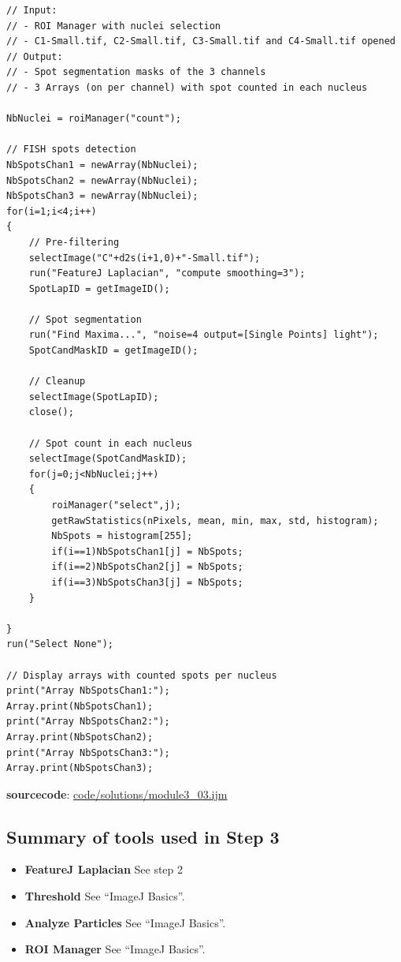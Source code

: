 \documentclass[11pt,a4paper,oneside]{report}
\begin{document}
\begin{lstlisting}[linerange={1-6}]
// Input: 
// - ROI Manager with nuclei selection
// - C1-Small.tif, C2-Small.tif, C3-Small.tif and C4-Small.tif opened
// Output: 
// - Spot segmentation masks of the 3 channels
// - 3 Arrays (on per channel) with spot counted in each nucleus

NbNuclei = roiManager("count");

// FISH spots detection
NbSpotsChan1 = newArray(NbNuclei);
NbSpotsChan2 = newArray(NbNuclei);
NbSpotsChan3 = newArray(NbNuclei);
for(i=1;i<4;i++)
{
	// Pre-filtering
	selectImage("C"+d2s(i+1,0)+"-Small.tif");
	run("FeatureJ Laplacian", "compute smoothing=3");
	SpotLapID = getImageID();
	
	// Spot segmentation
	run("Find Maxima...", "noise=4 output=[Single Points] light");
	SpotCandMaskID = getImageID();

	// Cleanup
	selectImage(SpotLapID);
	close();
	
	// Spot count in each nucleus
	selectImage(SpotCandMaskID);
	for(j=0;j<NbNuclei;j++)
	{ 	
		roiManager("select",j);
		getRawStatistics(nPixels, mean, min, max, std, histogram);
		NbSpots = histogram[255];
		if(i==1)NbSpotsChan1[j] = NbSpots;
		if(i==2)NbSpotsChan2[j] = NbSpots;
		if(i==3)NbSpotsChan3[j] = NbSpots;
	}
	
}
run("Select None");

// Display arrays with counted spots per nucleus
print("Array NbSpotsChan1:");
Array.print(NbSpotsChan1);
print("Array NbSpotsChan2:");
Array.print(NbSpotsChan2);
print("Array NbSpotsChan3:");
Array.print(NbSpotsChan3);
\end{lstlisting}
\textbf{sourcecode}: \href{http://www.example.com/contents}{code/solutions/module3\_03.ijm}

\subsection{Summary of tools used in Step 3}
\begin{itemize}
\item\textbf{FeatureJ Laplacian} See step 2

\item\textbf{Threshold} See ``ImageJ Basics''.
\item\textbf{Analyze Particles} See ``ImageJ Basics''.
\item\textbf{ROI Manager} See ``ImageJ Basics''.

\end{itemize}
\end{document}
